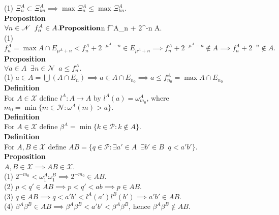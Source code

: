 \documentclass{article}
\newcommand{\targetset}{ \mathscr{X}}
\newcommand{\sourceset}{ \mathscr{P}}
\newcommand{\nondisjoints}{E}
\newcommand{\naturals}{ \mathscr{N}}
\newcommand{\carpenter}{ \omega }
\newcommand{\leaper}{l}
\newcommand{\climber}{ f}
\newcommand{\elt}{q}
\newcommand{\altelt}{p}
\newcommand{\umbrella}{\beta}
\newcommand{\interceptor}{\Xi}
\begin{document}
(1) $\interceptor^A_n \subset \interceptor^A_{kn} \implies \max \interceptor^A_n \le \max \interceptor^A_{kn} $.\\
 
 \textbf{Proposition}\\
 $\forall n \in \naturals \;\; f^A_n \in A.\\

\textbf{Proposition}\\
$\forall n \in \naturals \;\; f^A_n + 2^{-n} \notin A.\\

(1)$f^A_n = \max A \cap \nondisjoints_{\mu^A + n} <  f^A_n + 2^{-\mu^A - n} \in \nondisjoints_{\mu^A + n} \implies \climber^A_n + 2^{-\mu^A - n} \notin A \implies \climber^A_n + 2^{- n} \notin A.$\\

\textbf{Proposition}\\
$\forall a \in A \;\; \exists n \in \naturals \;\; a \le f^A_n.$\\ 

(1) $a \in A = \bigcup (A \cap \nondisjoints_n) \implies a \in A \cap \nondisjoints_{n_0} \implies a \le f^A_{n_0} = \max A \cap \nondisjoints_{n_0}$\\

\textbf{Definition}\\
For $A \in \targetset$ define $\leaper^A : A \to A$ by $\leaper^A(a) = \carpenter^A_{m_0}$, where $m_0 = \min \{ m \in \naturals : \carpenter^A(m) > a \}.$\\

\textbf{Definition}\\
For $A \in \targetset$ define $\umbrella^A= \min \{ k \in \sourceset : k \notin A \}.$\\ 

\textbf{Definition}\\
For $A, B \in \targetset$ define $AB = \{ \elt \in \sourceset : \exists a' \in A \;\; \exists b' \in B \;\; \elt < a'b' \}.$\\

\textbf{Proposition}\\
$A, B \in \targetset \implies AB \in \targetset$.\\ 

(1) $2^{-m_0} < \carpenter^A_1 \carpenter^B_1  \implies 2^{-m_0} \in AB$.\\
(2) $ \altelt < \elt' \in AB \implies \altelt < \elt' < ab \implies \altelt \in AB$.\\
(3) $\elt \in AB \implies \elt < a'b'  < \leaper^A(a') \leaper^B(b') \implies a'b' \in AB.$\\
(4) $\umbrella^A \umbrella^B \in AB \implies \umbrella^A \umbrella^B < a'b' < \umbrella^A \umbrella^B$, hence $\umbrella^A \umbrella^B \notin AB.$\\ 
\end{document}

